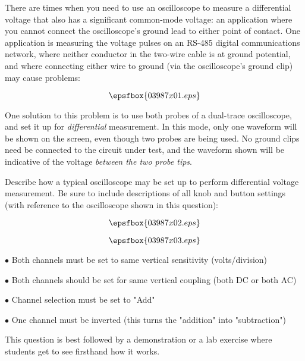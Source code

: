 

There are times when you need to use an oscilloscope to measure a differential voltage that also has a significant common-mode voltage: an application where you cannot connect the oscilloscope's ground lead to either point of contact.  One application is measuring the voltage pulses on an RS-485 digital communications network, where neither conductor in the two-wire cable is at ground potential, and where connecting either wire to ground (via the oscilloscope's ground clip) may cause problems:

$$\epsfbox{03987x01.eps}$$

One solution to this problem is to use both probes of a dual-trace oscilloscope, and set it up for {\it differential} measurement.  In this mode, only one waveform will be shown on the screen, even though two probes are being used.  No ground clips need be connected to the circuit under test, and the waveform shown will be indicative of the voltage {\it between the two probe tips}.

\goodbreak

Describe how a typical oscilloscope may be set up to perform differential voltage measurement.  Be sure to include descriptions of all knob and button settings (with reference to the oscilloscope shown in this question):

$$\epsfbox{03987x02.eps}$$







$$\epsfbox{03987x03.eps}$$

\medskip
\item{$\bullet$} Both channels must be set to same vertical sensitivity (volts/division)
\item{$\bullet$} Both channels should be set for same vertical coupling (both DC or both AC)
\item{$\bullet$} Channel selection must be set to "Add"
\item{$\bullet$} One channel must be inverted (this turns the "addition" into "subtraction")
\medskip







This question is best followed by a demonstration or a lab exercise where students get to see firsthand how it works.





